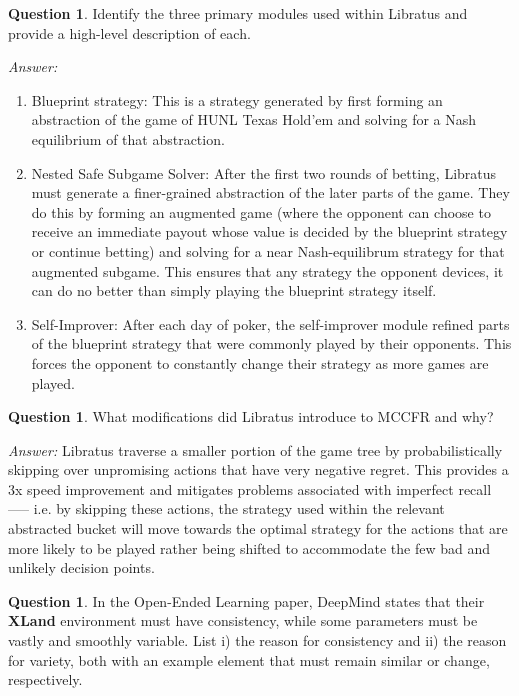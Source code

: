 \documentclass{article}
\theoremstyle{definition}
\newtheorem{question}[thm]{Question}
\newenvironment{answer}{\noindent\textit{Answer:}}{}
\begin{document}
\begin{question}
Identify the three primary modules used within Libratus and provide a high-level description of each.
\end{question}

\begin{answer}
\begin{enumerate}
\item Blueprint strategy: This is a strategy generated by first forming an abstraction of the game of HUNL Texas Hold’em and solving for a Nash equilibrium of that abstraction.
\item Nested Safe Subgame Solver: After the first two rounds of betting, Libratus must generate a finer-grained abstraction of the later parts of the game. They do this by forming an augmented game (where the opponent can choose to receive an immediate payout whose value is decided by the blueprint strategy or continue betting) and solving for a near Nash-equilibrum strategy for that augmented subgame. This ensures that any strategy the opponent devices, it can do no better than simply playing the blueprint strategy itself.   
\item Self-Improver: After each day of poker, the self-improver module refined parts of the blueprint strategy that were commonly played by their opponents. This forces the opponent to constantly change their strategy as more games are played. 
\end{enumerate}
\end{answer}

\begin{question}
What modifications did Libratus introduce to MCCFR and why?
\end{question}

\begin{answer}
Libratus traverse a smaller portion of the game tree by probabilistically skipping over unpromising actions that have very negative regret. This provides a 3x speed improvement and mitigates problems associated with imperfect recall —-- i.e. by skipping these actions, the strategy used within the relevant abstracted bucket will move towards the optimal strategy for the actions that are more likely to be played rather being shifted to accommodate the few bad and unlikely decision points. 
\end{answer}

\begin{question}
In the Open-Ended Learning paper, DeepMind states that their \textbf{XLand} environment must have consistency, while some parameters must be vastly and smoothly variable. List i) the reason for consistency and ii) the reason for variety, both with an example element that must remain similar or change, respectively.
\end{question}
\end{document}
